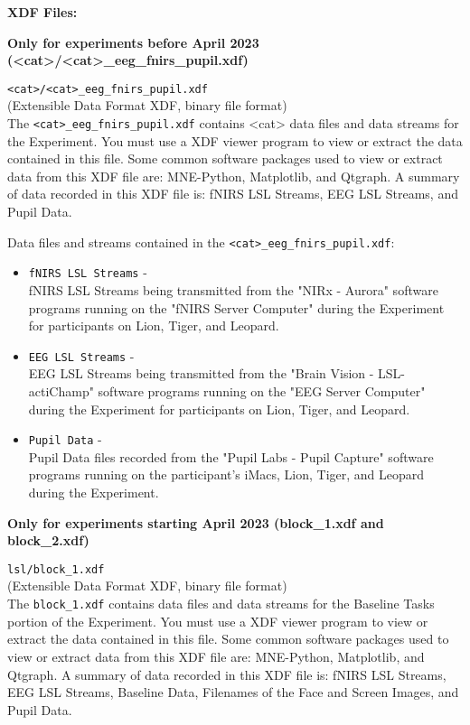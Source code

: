\begin{description}
\bigskip\bigskip\bigskip
\item\textbf{XDF Files:}
\begin{addmargin}[0em]{0em}
    \item\textbf{Only for experiments before April 2023 (<cat>/<cat>\_eeg\_fnirs\_pupil.xdf)}\\
    \item\verb|<cat>/<cat>_eeg_fnirs_pupil.xdf|\\(Extensible Data Format XDF, binary file format)\\
    The \verb|<cat>_eeg_fnirs_pupil.xdf| contains <cat> data files and data streams for the Experiment. You must use a XDF viewer program to view or extract the data contained in this file. Some common software packages used to view or extract data from this XDF file are: MNE-Python, Matplotlib, and Qtgraph. A summary of data recorded in this XDF file is: fNIRS LSL Streams, EEG LSL Streams, and Pupil Data.

    Data files and streams contained in the \verb|<cat>_eeg_fnirs_pupil.xdf|:

    \begin{itemize}
        \item \verb|fNIRS LSL Streams| -\\fNIRS LSL Streams being transmitted from the "NIRx - Aurora" software programs running on the "fNIRS Server Computer" during the Experiment for participants on Lion, Tiger, and Leopard.
        \item \verb|EEG LSL Streams| -\\EEG LSL Streams being transmitted from the "Brain Vision - LSL-actiChamp" software programs running on the "EEG Server Computer" during the Experiment for participants on Lion, Tiger, and Leopard.
        \item \verb|Pupil Data| -\\Pupil Data files recorded from the "Pupil Labs - Pupil Capture" software programs running on the participant's iMacs, Lion, Tiger, and Leopard during the Experiment.
    \end{itemize}

\end{addmargin}

\bigskip
\begin{addmargin}[0em]{0em}
    \item\textbf{Only for experiments starting April 2023 (block\_1.xdf and block\_2.xdf)\\}
    \item\verb|lsl/block_1.xdf|\\(Extensible Data Format XDF, binary file format)\\
    The \verb|block_1.xdf| contains data files and data streams for the Baseline Tasks portion of the Experiment. You must use a XDF viewer program to view or extract the data contained in this file. Some common software packages used to view or extract data from this XDF file are: MNE-Python, Matplotlib, and Qtgraph. A summary of data recorded in this XDF file is: fNIRS LSL Streams, EEG LSL Streams, Baseline Data, Filenames of the Face and Screen Images, and Pupil Data.


\end{addmargin}
\end{description}
